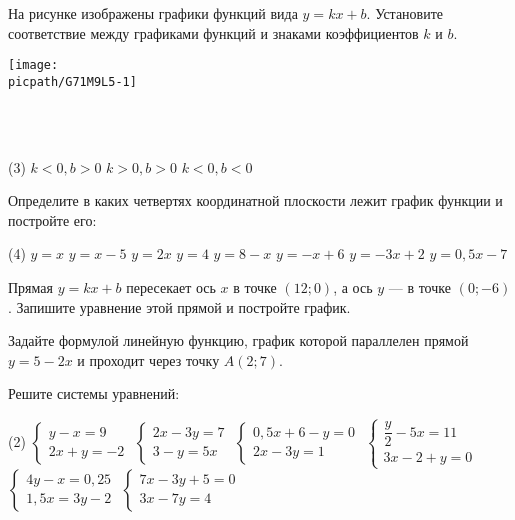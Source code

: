 \begin{class}[number=5]
	\begin{listofex}
		\item На рисунке изображены графики функций вида \(y = kx + b\). Установите соответствие между графиками функций и знаками коэффициентов \(k\) и \(b\).
		\begin{minipage}[t]{\linewidth}
			\texttt{[image: \\picpath/G71M9L5-1]}
		\end{minipage}
		\\
		\\
		\begin{minipage}[t]{\linewidth}
			\begin{tasks}(3)
				\task \( k<0, b>0 \)
				\task \( k>0, b>0 \)
				\task \( k<0, b<0 \)
			\end{tasks}
		\end{minipage}
		\item Определите в каких четвертях координатной плоскости лежит график функции и постройте его:
		\begin{tasks}(4)
			\task \( y=x \)
			\task \( y=x-5 \)
			\task \( y=2x \)
			\task \( y=4 \)
			\task \( y=8-x \)
			\task \( y=-x+6 \)
			\task \( y=-3x+2 \)
			\task \( y=0,5x-7 \)
		\end{tasks}
		\item Прямая \(y=kx+b\) пересекает ось \(x\) в точке \((12; 0)\), а ось \(y\) --- в точке \((0; -6)\). Запишите уравнение этой прямой и постройте график.
		\item Задайте формулой линейную функцию, график которой параллелен прямой \(y=5-2x\) и проходит через точку \(A(2; 7)\).
		\item Решите системы уравнений:
		\begin{tasks}(2)
			\task \( \begin{cases} y-x=9 \\ 2x+y=-2 \end{cases} \)
			\task \( \begin{cases} 2x-3y=7 \\ 3-y=5x \end{cases} \)
			\task \( \begin{cases} 0,5x+6-y=0 \\ 2x-3y=1 \end{cases} \)
			\task \( \begin{cases} \dfrac{ y }{ 2 }-5x=11 \\ 3x-2+y=0 \end{cases} \)
			\task \( \begin{cases} 4y-x=0,25 \\ 1,5x=3y-2 \end{cases} \)
			\task \( \begin{cases} 7x-3y+5=0 \\ 3x-7y=4 \end{cases} \)
		\end{tasks}
	\end{listofex}
\end{class}

